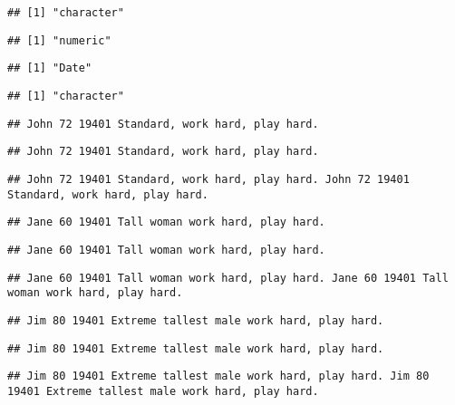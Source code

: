 \documentclass[
]{article}
\begin{document}
\begin{verbatim}
## [1] "character"
\end{verbatim}

\begin{verbatim}
## [1] "numeric"
\end{verbatim}

\begin{verbatim}
## [1] "Date"
\end{verbatim}

\begin{verbatim}
## [1] "character"
\end{verbatim}

\begin{verbatim}
## John 72 19401 Standard, work hard, play hard.
\end{verbatim}

\begin{verbatim}
## John 72 19401 Standard, work hard, play hard.
\end{verbatim}

\begin{verbatim}
## John 72 19401 Standard, work hard, play hard. John 72 19401 Standard, work hard, play hard.
\end{verbatim}

\begin{verbatim}
## Jane 60 19401 Tall woman work hard, play hard.
\end{verbatim}

\begin{verbatim}
## Jane 60 19401 Tall woman work hard, play hard.
\end{verbatim}

\begin{verbatim}
## Jane 60 19401 Tall woman work hard, play hard. Jane 60 19401 Tall woman work hard, play hard.
\end{verbatim}

\begin{verbatim}
## Jim 80 19401 Extreme tallest male work hard, play hard.
\end{verbatim}

\begin{verbatim}
## Jim 80 19401 Extreme tallest male work hard, play hard.
\end{verbatim}

\begin{verbatim}
## Jim 80 19401 Extreme tallest male work hard, play hard. Jim 80 19401 Extreme tallest male work hard, play hard.
\end{verbatim}
\end{document}
